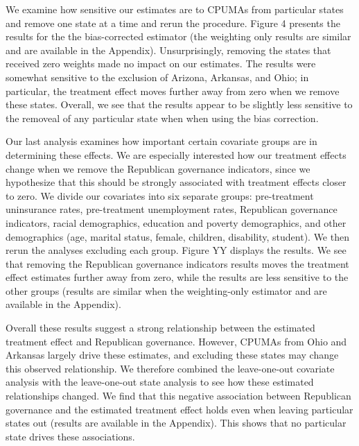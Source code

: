 \documentclass[12pt]{article}
\begin{document}
We examine how sensitive our estimates are to CPUMAs from particular states and remove one state at a time and rerun the procedure. Figure 4 presents the results for the the bias-corrected estimator (the weighting only results are similar and are available in the Appendix). Unsurprisingly, removing the states that received zero weights made no impact on our estimates. The results were somewhat sensitive to the exclusion of Arizona, Arkansas, and Ohio; in particular, the treatment effect moves further away from zero when we remove these states. Overall, we see that the results appear to be slightly less sensitive to the removeal of any particular state when when using the bias correction.

Our last analysis examines how important certain covariate groups are in determining these effects. We are especially interested how our treatment effects change when we remove the Republican governance indicators, since we hypothesize that this should be strongly associated with treatment effects closer to zero. We divide our covariates into six separate groups: pre-treatment uninsurance rates, pre-treatment unemployment rates, Republican governance indicators, racial demographics, education and poverty demographics, and other demographics (age, marital status, female, children, disability, student). We then rerun the analyses excluding each group. Figure YY displays the results. We see that removing the Republican governance indicators results moves the treatment effect estimates further away from zero, while the results are less sensitive to the other groups (results are similar when the weighting-only estimator and are available in the Appendix). 


Overall these results suggest a strong relationship between the estimated treatment effect and Republican governance. However, CPUMAs from Ohio and Arkansas largely drive these estimates, and excluding these states may change this observed relationship. We therefore combined the leave-one-out covariate analysis with the leave-one-out state analysis to see how these estimated relationships changed. We find that this negative association between Republican governance and the estimated treatment effect holds even when leaving particular states out (results are available in the Appendix). This shows that no particular state drives these associations. 
\end{document}
